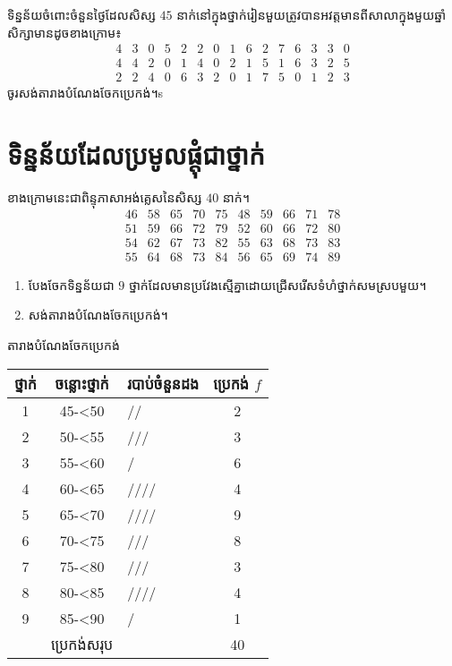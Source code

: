 \documentclass[a4paper,12pt,blue]{pptec}
\begin{document}
	\begin{example}
		ទិន្នន័យចំពោះចំនួនថ្ងៃដែលសិស្ស $ 45 $ នាក់នៅក្នុងថ្នាក់រៀនមួយត្រូវបានអវត្តមានពីសាលាក្នុងមួយឆ្នាំសិក្សាមានដូចខាងក្រោម៖
		\begin{equation*}
		\begin{array}{ccccccccccccccc}
		4 & 3 & 0 & 5 & 2 & 2 & 0 & 1 & 6 & 2 & 7 & 6 & 3 & 3 & 0\\
		4 & 4 & 2 & 0 & 1 & 4 & 0 & 2 & 1 & 5 & 1 & 6 & 3 & 2 & 5\\
		2 & 2 & 4 & 0 & 6 & 3 & 2 & 0 & 1 & 7 & 5 & 0 & 1 & 2 & 3
		\end{array}
		\end{equation*}
		ចូរសង់តារាងបំណែងចែកប្រេកង់។s
	\end{example}
	\section{ទិន្នន័យដែលប្រមូលផ្ដុំជាថ្នាក់}
	\begin{example}
		ខាងក្រោមនេះជាពិន្ទុភាសាអង់គ្លេសនៃសិស្ស $ 40 $ នាក់។
		\begin{equation*}
		\begin{array}{cccccccccc}
		46 & 58 & 65 & 70 & 75 & 48 & 59 & 66 & 71 & 78\\
		51 & 59 & 66 & 72 & 79 & 52 & 60 & 66 & 72 & 80\\
		54 & 62 & 67 & 73 & 82 & 55 & 63 & 68 & 73 & 83\\
		55 & 64 & 68 & 73 & 84 & 56 & 65 & 69 & 74 & 89
		\end{array}
		\end{equation*}
		\begin{enumerate}[k]
			\item បែងចែកទិន្នន័យជា $ 9 $ ថ្នាក់ដែលមានប្រវែងស្មើគ្នាដោយជ្រើសរើសទំហំថ្នាក់សមស្របមួយ។
			\item សង់តារាងបំណែងចែកប្រេកង់។
		\end{enumerate}
	\end{example}
	\begin{answer}
	តារាងបំណែងចែកប្រេកង់
	\begin{table}[H]
		\centering
		\begin{tabular}{|c|c|l|c|}
			\hline
			ថ្នាក់ & ចន្លោះថ្នាក់ & របាប់ចំនួនដង & ប្រេកង់ $ f $\\
			\hline
			1 & 45-<50 & // & 2\\
			\hline
			2 & 50-<55 & /// & 3\\
			\hline
			3 & 55-<60 & \cancel{////} / & 6\\
			\hline
			4 & 60-<65 & //// & 4\\
			\hline
			5 & 65-<70 & \cancel{////} //// & 9\\
			\hline
			6 & 70-<75 & \cancel{////} /// & 8\\
			\hline
			7 & 75-<80 & /// & 3\\
			\hline
			8 & 80-<85 & //// & 4\\
			\hline
			9 & 85-<90 & / & 1\\
			\hline
			& ប្រេកង់សរុប & & 40\\
			\hline
		\end{tabular}
	\end{table}
	\end{answer}
\end{document}

